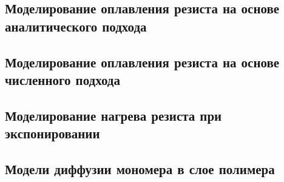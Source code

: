 \subsection{Моделирование оплавления резиста на основе аналитического подхода}

\subsection{Моделирование оплавления резиста на основе численного подхода}

\subsection{Моделирование нагрева резиста при экспонировании}

\subsection{Модели диффузии мономера в слое полимера}




